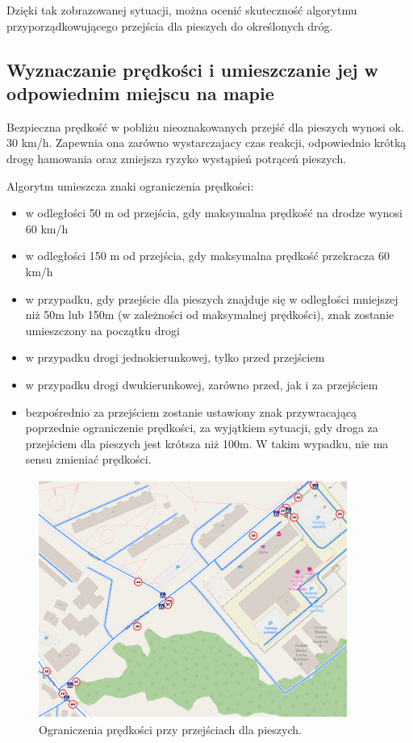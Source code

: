 Dzięki tak zobrazowanej sytuacji, można ocenić skuteczność algorytmu przyporządkowującego przejścia dla pieszych do określonych dróg.

\subsection{Wyznaczanie prędkości i umieszczanie jej w odpowiednim miejscu na mapie}

Bezpieczna prędkość w pobliżu nieoznakowanych przejść dla pieszych wynosi ok. 30 km/h. Zapewnia ona zarówno wystarczajacy czas reakcji, odpowiednio krótką drogę hamowania oraz zmiejsza ryzyko wystąpień potrąceń pieszych.

Algorytm umieszcza znaki ograniczenia prędkości:
\begin{itemize}
\item w odległości 50 m od przejścia, gdy maksymalna prędkość na drodze wynosi 60 km/h
\item w odległości 150 m od przejścia, gdy maksymalna prędkość przekracza 60 km/h
\item w przypadku, gdy przejście dla pieszych znajduje się w odległości mniejszej niż 50m lub 150m (w zależności od maksymalnej prędkości), znak zostanie umieszczony na początku drogi
\item w przypadku drogi jednokierunkowej, tylko przed przejściem
\item w przypadku drogi dwukierunkowej, zarówno przed, jak i za przejściem
\item bezpośrednio za przejściem zostanie ustawiony znak przywracającą poprzednie ograniczenie prędkości, za wyjątkiem sytuacji, gdy droga za przejściem dla pieszych jest krótsza niż 100m. W takim wypadku, nie ma sensu zmieniać prędkości.
\end{itemize}

\begin{figure}[h]
\caption{Ograniczenia prędkości przy przejściach dla pieszych.}
\label{sec:przejsciePredkosci}
\centering
\includegraphics[width=0.9\textwidth]{pedestrian_speed}
\end{figure}

